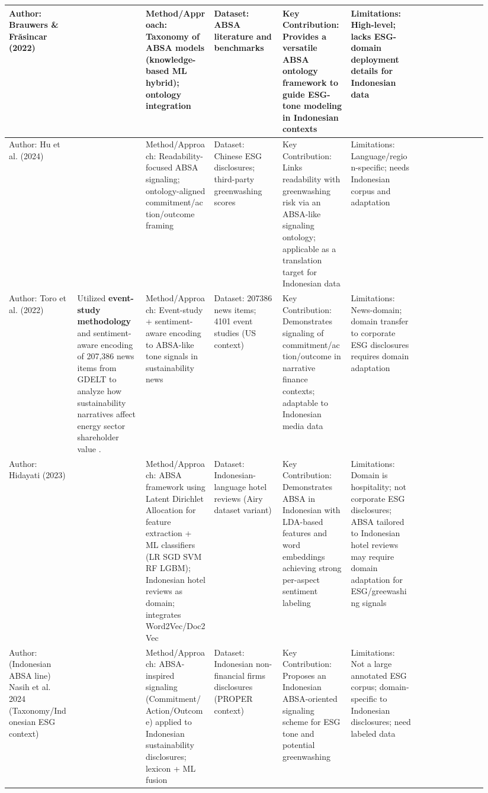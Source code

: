 \documentclass{article}
\begin{document}
\begin{landscape}
\begin{longtable}{p{0.134\linewidth} p{0.134\linewidth} p{0.134\linewidth} p{0.134\linewidth} p{0.134\linewidth} p{0.134\linewidth} p{0.134\linewidth}}
Author: Brauwers \& Frăsincar (2022) & ~ & Method/Approach: Taxonomy of ABSA models (knowledge-based ML hybrid); ontology integration & Dataset: ABSA literature and benchmarks & Key Contribution: Provides a versatile ABSA ontology framework to guide ESG-tone modeling in Indonesian contexts & Limitations: High-level; lacks ESG-domain deployment details for Indonesian data \\ \hline
Author: Hu et al. (2024) & ~ & Method/Approach: Readability-focused ABSA signaling; ontology-aligned commitment/action/outcome framing & Dataset: Chinese ESG disclosures; third-party greenwashing scores & Key Contribution: Links readability with greenwashing risk via an ABSA-like signaling ontology; applicable as a translation target for Indonesian data & Limitations: Language/region-specific; needs Indonesian corpus and adaptation \\ \hline
Author: Toro et al. (2022) & Utilized \textbf{event-study methodology} and sentiment-aware encoding of 207,386 news items from GDELT to analyze how sustainability narratives affect energy sector shareholder value  \parencite{alberto_barroso_del_toro_eb0c419a}. & Method/Approach: Event-study + sentiment-aware encoding to ABSA-like tone signals in sustainability news & Dataset: 207386 news items; 4101 event studies (US context) & Key Contribution: Demonstrates signaling of commitment/action/outcome in narrative finance contexts; adaptable to Indonesian media data & Limitations: News-domain; domain transfer to corporate ESG disclosures requires domain adaptation \\ \hline
Author: Hidayati (2023) & ~ & Method/Approach: ABSA framework using Latent Dirichlet Allocation for feature extraction + ML classifiers (LR SGD SVM RF LGBM); Indonesian hotel reviews as domain; integrates Word2Vec/Doc2Vec & Dataset: Indonesian-language hotel reviews (Airy dataset variant) & Key Contribution: Demonstrates ABSA in Indonesian with LDA-based features and word embeddings achieving strong per-aspect sentiment labeling & Limitations: Domain is hospitality; not corporate ESG disclosures; ABSA tailored to Indonesian hotel reviews may require domain adaptation for ESG/greewashing signals \\ \hline
Author: (Indonesian ABSA line) Nasih et al. 2024 (Taxonomy/Indonesian ESG context) & ~ & Method/Approach: ABSA-inspired signaling (Commitment/Action/Outcome) applied to Indonesian sustainability disclosures; lexicon + ML fusion & Dataset: Indonesian non-financial firms disclosures (PROPER context) & Key Contribution: Proposes an Indonesian ABSA-oriented signaling scheme for ESG tone and potential greenwashing & Limitations: Not a large annotated ESG corpus; domain-specific to Indonesian disclosures; need labeled data \\ \hline

\end{longtable}
\end{landscape}
\end{document}
